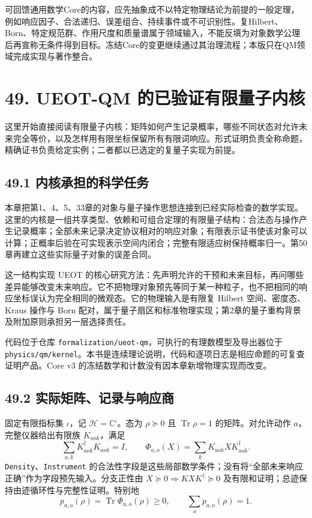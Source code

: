 \documentclass[
  11pt,
  oneside]{book}
\begin{document}
可回馈通用数学Core的内容，应先抽象成不以特定物理结论为前提的一般定理，例如响应因子、合法递归、误差组合、持续事件或不可识别性。复Hilbert、Born、特定规范群、作用尺度和质量谱属于领域输入，不能反填为对象数学公理后再宣称无条件得到目标。冻结Core的变更继续通过其治理流程；本版只在QM领域完成实现与著作整合。

\chapter{49. UEOT-QM 的已验证有限量子内核}\label{ch-49}\hypertarget{ch-49}{}

这里开始直接阅读有限量子内核：矩阵如何产生记录概率，哪些不同状态对允许未来完全等价，以及怎样用有限坐标保留所有有限词响应。形式证明负责全称命题，精确证书负责给定实例；二者都以已选定的复量子实现为前提。

\section{49.1 内核承担的科学任务}

本章把第1、4、5、33章的对象与量子操作思想连接到已经实际检查的数学实现。这里的内核是一组共享类型、依赖和可组合定理的有限量子结构：合法态与操作产生记录概率；全部未来记录决定协议相对的响应对象；有限表示证书使该对象可以计算；正概率后验在可实现表示空间内闭合；完整有限适应树保持概率归一。第50章再建立这些实际量子对象的误差合同。

这一结构实现 UEOT
的核心研究方法：先声明允许的干预和未来目标，再问哪些差异能够改变未来响应。它不把物理对象预先等同于某一种粒子，也不把相同的响应坐标误认为完全相同的微观态。它的物理输入是有限复
Hilbert 空间、密度态、Kraus 操作与 Born
配对，属于量子扇区和标准物理实现；第2章的量子重构背景及附加原则承担另一层选择责任。

代码位于仓库
\texttt{formalization/\allowbreak ueot-\allowbreak qm}，可执行的有理数模型及导出器位于
\texttt{physics/\allowbreak qm/\allowbreak kernel}。本书是连续理论说明，代码和逐项日志是相应命题的可复查证明产品。Core
v3 的冻结数学和计数没有因本章新增物理实现而改变。

\section{49.2 实际矩阵、记录与响应商}

固定有限指标集 \(\iota\)，记 \(\mathcal H=\mathbb C^{\iota}\)。态为
\(\rho\succeq0\) 且 \(\operatorname{Tr}\rho=1\) 的矩阵。对允许动作
\(a\)，完整仪器给出有限族 \(K_{aok}\)，满足 \[
\sum_{o,k}K_{aok}^{\dagger}K_{aok}=I,
\qquad \Phi_{a,o}(X)=\sum_kK_{aok}XK_{aok}^{\dagger}.
\] \texttt{Density}、\allowbreak \texttt{Instrument}
的合法性字段是这些局部数学条件；没有将``全部未来响应正确''作为字段预先输入。分支正性由
\(X\succeq0\Rightarrow KXK^\dagger\succeq0\)
及有限和证明；总迹保持由迹循环性与完整性证明。特别地 \[
p_{a,o}(\rho)=\operatorname{Tr}\Phi_{a,o}(\rho)\ge0,
\qquad \sum_op_{a,o}(\rho)=1.
\]
\end{document}
